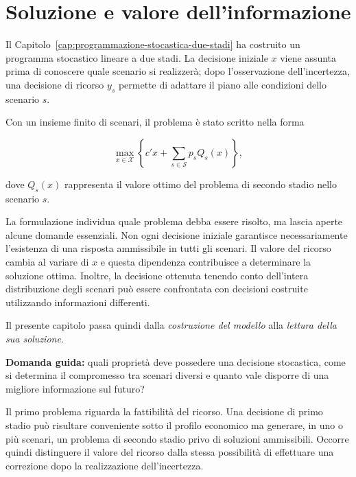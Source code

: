 
\chapter{Soluzione e valore dell'informazione}

\label{cap:soluzione-valore-informazione}

\medskip

Il Capitolo~\ref{cap:programmazione-stocastica-due-stadi} ha costruito un
programma stocastico lineare a due stadi. La decisione iniziale $x$ viene
assunta prima di conoscere quale scenario si realizzer\`a; dopo
l'osservazione dell'incertezza, una decisione di ricorso $y_s$ permette di
adattare il piano alle condizioni dello scenario $s$.

Con un insieme finito di scenari, il problema \`e stato scritto nella forma

\[
\max_{x\in\mathcal X}
\left\{
c'x+
\sum_{s\in\mathcal S}p_sQ_s(x)
\right\},
\]

dove $Q_s(x)$ rappresenta il valore ottimo del problema di secondo stadio
nello scenario $s$.

La formulazione individua quale problema debba essere risolto, ma lascia
aperte alcune domande essenziali. Non ogni decisione iniziale garantisce
necessariamente l'esistenza di una risposta ammissibile in tutti gli scenari.
Il valore del ricorso cambia al variare di $x$ e questa dipendenza
contribuisce a determinare la soluzione ottima. Inoltre, la decisione ottenuta
tenendo conto dell'intera distribuzione degli scenari pu\`o essere confrontata
con decisioni costruite utilizzando informazioni differenti.

Il presente capitolo passa quindi dalla \emph{costruzione del modello} alla
\emph{lettura della sua soluzione}.

\medskip

\noindent
\textbf{Domanda guida:} quali propriet\`a deve possedere una decisione
stocastica, come si determina il compromesso tra scenari diversi e quanto
vale disporre di una migliore informazione sul futuro?

\medskip

Il primo problema riguarda la fattibilit\`a del ricorso. Una decisione di
primo stadio pu\`o risultare conveniente sotto il profilo economico ma
generare, in uno o pi\`u scenari, un problema di secondo stadio privo di
soluzioni ammissibili. Occorre quindi distinguere il valore del ricorso
dalla stessa possibilit\`a di effettuare una correzione dopo la realizzazione
dell'incertezza.

